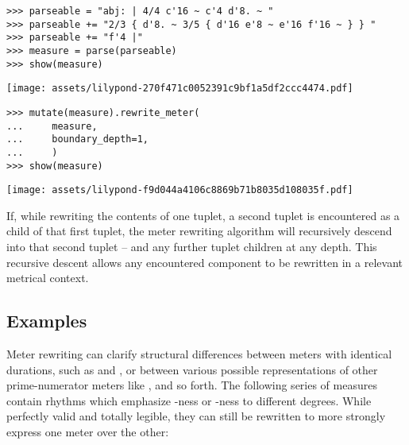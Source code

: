 \begin{abjadbookoutput}
\begin{singlespacing}
\vspace{-0.5\baselineskip}
\begin{verbatim}
>>> parseable = "abj: | 4/4 c'16 ~ c'4 d'8. ~ "
>>> parseable += "2/3 { d'8. ~ 3/5 { d'16 e'8 ~ e'16 f'16 ~ } } "
>>> parseable += "f'4 |"
>>> measure = parse(parseable)
>>> show(measure)
\end{verbatim}
\noindent\texttt{[image: assets/lilypond-270f471c0052391c9bf1a5df2ccc4474.pdf]}
\begin{verbatim}
>>> mutate(measure).rewrite_meter(
...     measure,
...     boundary_depth=1,
...     )
>>> show(measure)
\end{verbatim}
\noindent\texttt{[image: assets/lilypond-f9d044a4106c8869b71b8035d108035f.pdf]}
\end{singlespacing}
\end{abjadbookoutput}

\noindent If, while rewriting the contents of one tuplet, a second tuplet is
encountered as a child of that first tuplet, the meter rewriting algorithm will
recursively descend into that second tuplet -- and any further tuplet children
at any depth. This recursive descent allows any encountered component to be
rewritten in a relevant metrical context.

\subsection{Examples}
\label{ssec:meter-rewriting-examples}

Meter rewriting can clarify structural differences between meters with
identical durations, such as  and , or between various
possible representations of other prime-numerator meters like ,
 and so forth. The following series of  measures
contain rhythms which emphasize -ness or -ness to
different degrees. While perfectly valid and totally legible, they can still be
rewritten to more strongly express one meter over the other:

\begin{comment}
<abjad>
staff = Staff(context_name='RhythmicStaff')
staff.extend("{ c'2 c'4 } { c'4. c'4. } { c'2 ~ c'8 c'8 }")
attach(TimeSignature((3, 4)), staff)
show(staff)
</abjad>
\end{comment}

